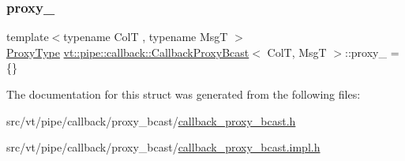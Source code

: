 \mbox{\label{structvt_1_1pipe_1_1callback_1_1_callback_proxy_bcast_ac10679541d8f497b5c2440e5c780aab2}} 
\subsubsection{\texorpdfstring{proxy\+\_\+}{proxy\_}}
{\footnotesize\ttfamily template$<$typename ColT , typename MsgT $>$ \\
\hyperlink{structvt_1_1pipe_1_1callback_1_1_callback_proxy_bcast_a27c62cb9cbd1dcd3f135dcd98d98c991}{Proxy\+Type} \hyperlink{structvt_1_1pipe_1_1callback_1_1_callback_proxy_bcast}{vt\+::pipe\+::callback\+::\+Callback\+Proxy\+Bcast}$<$ ColT, MsgT $>$\+::proxy\+\_\+ = \{\}\hspace{0.3cm}{\ttfamily [private]}}



The documentation for this struct was generated from the following files\+:\begin{DoxyCompactItemize}
\item 
src/vt/pipe/callback/proxy\+\_\+bcast/\hyperlink{callback__proxy__bcast_8h}{callback\+\_\+proxy\+\_\+bcast.\+h}\item 
src/vt/pipe/callback/proxy\+\_\+bcast/\hyperlink{callback__proxy__bcast_8impl_8h}{callback\+\_\+proxy\+\_\+bcast.\+impl.\+h}\end{DoxyCompactItemize}
